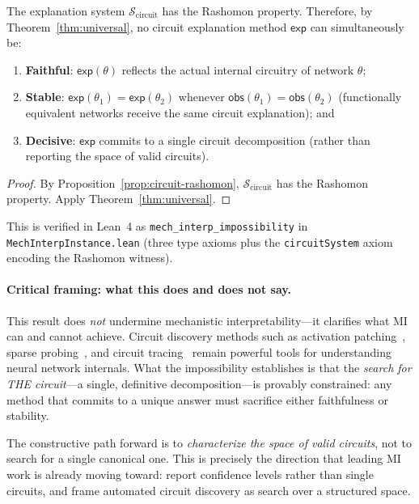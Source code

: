 \begin{theorem}
\label{thm:mech-interp-impossibility}
The explanation system $\mathcal{S}_{\mathrm{circuit}}$ has the Rashomon
property.  Therefore, by Theorem~\ref{thm:universal}, no circuit
explanation method $\mathsf{exp}$ can simultaneously be:
\begin{enumerate}
  \item \textbf{Faithful}: $\mathsf{exp}(\theta)$ reflects the actual
    internal circuitry of network $\theta$;
  \item \textbf{Stable}: $\mathsf{exp}(\theta_1) = \mathsf{exp}(\theta_2)$
    whenever $\mathsf{obs}(\theta_1) = \mathsf{obs}(\theta_2)$ (functionally
    equivalent networks receive the same circuit explanation); and
  \item \textbf{Decisive}: $\mathsf{exp}$ commits to a single circuit
    decomposition (rather than reporting the space of valid circuits).
\end{enumerate}
\end{theorem}

\begin{proof}
By Proposition~\ref{prop:circuit-rashomon},
$\mathcal{S}_{\mathrm{circuit}}$ has the Rashomon property.
Apply Theorem~\ref{thm:universal}.
\end{proof}

This is verified in Lean~4 as
\texttt{mech\_interp\_impossibility} in
\texttt{MechInterpInstance.lean} (three type axioms plus the
\texttt{circuitSystem} axiom encoding the Rashomon witness).

\paragraph{Critical framing: what this does and does not say.}
This result does \emph{not} undermine mechanistic interpretability---it
clarifies what MI can and cannot achieve.  Circuit discovery methods such as
activation patching~\citep{conmy2023automated}, sparse probing~\citep{elhage2022toy},
and circuit tracing~\citep{anthropic2025circuit} remain powerful tools for
understanding neural network internals.  What the impossibility establishes
is that the \emph{search for THE circuit}---a single, definitive
decomposition---is provably constrained: any method that commits to a
unique answer must sacrifice either faithfulness or stability.

The constructive path forward is to \emph{characterize the space of valid
circuits}, not to search for a single canonical one.  This is precisely
the direction that leading MI work is already moving toward:
\citet{anthropic2025circuit} report confidence levels rather than single
circuits, and \citet{conmy2023automated} frame automated circuit discovery
as search over a structured space.

